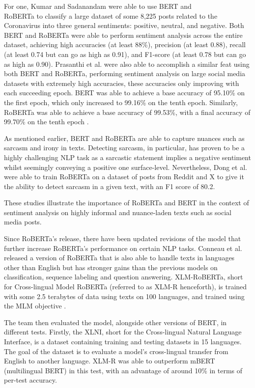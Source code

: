 For one, Kumar and Sadanandam \cite{Kumar-2023} were able to use BERT and\\
RoBERTa to classify a large dataset of some 8,225 posts related to the Coronavirus into three general sentiments: positive, neutral, and negative. Both BERT and RoBERTa were able to perform sentiment analysis across the entire dataset, achieving high accuracies (at least 88\%), precision (at least 0.88), recall (at least 0.74 but can go as high as 0.91), and F1-score (at least 0.78 but can go as high as 0.90). Prasanthi et al. \cite{Prasanthi-2023} were also able to accomplish a similar feat using both BERT and RoBERTa, performing sentiment analysis on large social media datasets with extremely high accuracies, these accuracies only improving with each succeeding epoch. BERT was able to achieve a base accuracy of 95.10\% on the first epoch, which only increased to 99.16\% on the tenth epoch. Similarly, RoBERTa was able to achieve a base accuracy of 99.53\%, with a final accuracy of 99.70\% on the tenth epoch \cite{Prasanthi-2023}.

As mentioned earlier, BERT and RoBERTa are able to capture nuances such as sarcasm and irony in texts. Detecting sarcasm, in particular, has proven to be a highly challenging NLP task as a sarcastic statement implies a negative sentiment whilst seemingly conveying a positive one surface-level. Nevertheless, Dong et al. \cite{Dong-2020} were able to train RoBERTa on a dataset of posts from Reddit and X to give it the ability to detect sarcasm in a given text, with an F1 score of 80.2.

These studies illustrate the importance of RoBERTa and BERT in the context of sentiment analysis on highly informal and nuance-laden texts such as social media posts. 

Since RoBERTa’s release, there have been updated revisions of the model that further increase RoBERTa’s performance on certain NLP tasks. Conneau et al. \cite{Conneau-2020} released a version of RoBERTa that is also able to handle texts in languages other than English but has stronger gains than the previous models on classification, sequence labeling and question answering. XLM-RoBERTa, short for Cross-lingual Model RoBERTa (referred to as XLM-R henceforth), is trained with some 2.5 terabytes of data using texts on 100 languages, and trained using the MLM objective \cite{Conneau-2020}.

The team then evaluated the model, alongside other versions of BERT, in different tests. Firstly, the XLNI, short for the Cross-lingual Natural Language Interface, is a dataset containing training and testing datasets in 15 languages. The goal of the dataset is to evaluate a model’s cross-lingual transfer from English to another language. XLM-R was able to outperform mBERT (multilingual BERT) in this test, with an advantage of around 10\% in terms of per-test accuracy.

